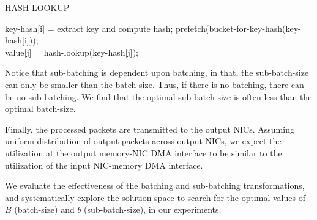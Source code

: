 \begin{algorithm}[H]
 \caption{HASH LOOKUP}
 \label{algo:prefetch}
 \begin{algorithmic}[1]
     \State key-hash[i] = extract key and compute hash; \label{hash-compute-line}
     \State prefetch(bucket-for-key-hash(key-hash[i])); \label{prefetch-line}
 \EndFor
 \\
     \State value[j] = hash-lookup(key-hash[j]); \label{hash-lookup-line}
 \EndFor
 \end{algorithmic}
\end{algorithm}
Notice that sub-batching is dependent upon batching, in that, the sub-batch-size can only be smaller than the batch-size. Thus, if there is no
batching, there can be no sub-batching. We find that the optimal sub-batch-size is often less than the
optimal batch-size.

Finally, the processed packets are transmitted to the output NICs. Assuming uniform distribution of output packets
across output NICs, we expect
the utilization at the output memory-NIC DMA interface to be similar to the utilization of the input NIC-memory DMA
interface.

We evaluate the effectiveness of the batching and sub-batching transformations, and systematically explore
the solution space to search for the optimal values of $B$ (batch-size) and $b$ (sub-batch-size), in our experiments.

